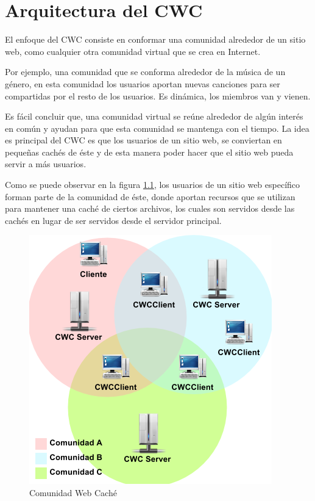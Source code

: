 
\chapter{Arquitectura del CWC} %

\label{ch:arquitectura_cwc} %

El enfoque del CWC consiste en conformar una comunidad alrededor de un sitio web, como cualquier otra comunidad virtual que se crea en Internet. 

Por ejemplo, una comunidad que se conforma alrededor de la música de un género, en esta comunidad los usuarios aportan nuevas canciones para ser compartidas por el resto de los usuarios. Es dinámica, los miembros van y vienen.

Es fácil concluir que, una comunidad virtual se reúne alrededor de algún interés en común  y ayudan para que esta comunidad se mantenga con el tiempo. La idea es principal del CWC  es que los usuarios de un sitio web, se conviertan en pequeñas cachés de éste y de esta manera poder hacer que el sitio web pueda servir a más usuarios. 

Como se puede observar en la figura \ref{ComunidadWebCache}, los usuarios de un sitio web específico forman parte de la comunidad de éste, donde aportan recursos que se utilizan para mantener una caché de ciertos archivos, los cuales son servidos desde las cachés en lugar de ser servidos desde el servidor principal.

\begin{figure}[h]
  \centering
    \includegraphics[scale=0.5]{gfx/ComunidadWebCache}
  \caption{Comunidad Web Caché}
  \label{ComunidadWebCache}
\end{figure}

